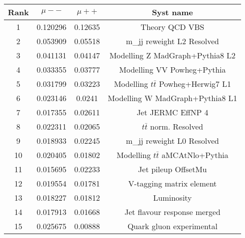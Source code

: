 \begin{table}[htbp]
  \centering
  \begin{tabular}{|c|c|c|c|}

\hline
Rank & $\mu - -$ & $\mu ++$ & Syst name \\ \hline
1 & 0.120296 & 0.12635 & Theory QCD VBS \\
2 & 0.053909 & 0.05518 & m\_{jj} reweight L2 Resolved \\ 
3 & 0.041131 & 0.04147 & Modelling Z MadGraph+Pythia8 L2 \\
4 & 0.033355 & 0.03777 &  Modelling VV Powheg+Pythia \\ 
5 & 0.031799 & 0.03223 & Modelling $t\bar{t}$ Powheg+Herwig7 L1 \\
6 & 0.023146 & 0.0241 & Modelling W MadGraph+Pythia8 L1 \\ 
7 & 0.017355 & 0.02611 & Jet JERMC EffNP 4 \\
8 & 0.022311 & 0.02065 & $t\bar{t}$ norm. Resolved \\
9 & 0.018933 & 0.02245 & m\_{jj} reweight L0 Resolved \\ 
10 & 0.020405 & 0.01802 & Modelling $t\bar{t}$ aMCAtNlo+Pythia \\
11 & 0.015695 & 0.02233 & Jet pileup OffsetMu \\
12 & 0.019554 & 0.01781 & V-tagging matrix element \\
13 & 0.018227 & 0.01812 & Luminosity \\
14 & 0.017913 & 0.01668 & Jet flavour response merged \\
15 & 0.025675 & 0.00888 & Quark gluon experimental \\
\hline

\end{tabular}
\end{table}
